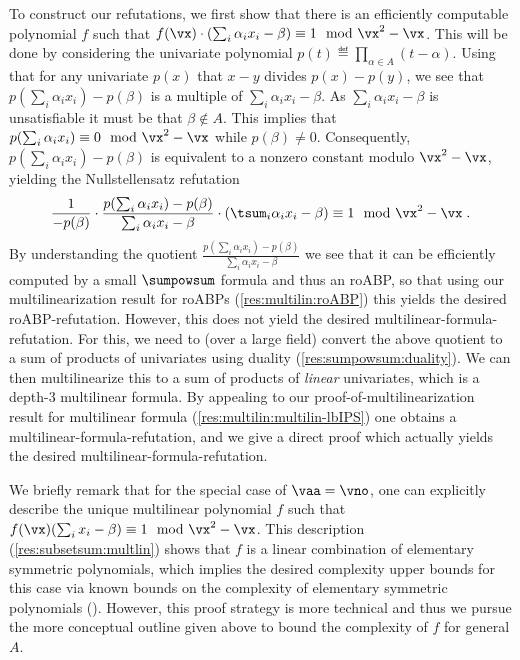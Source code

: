 \documentclass[11pt]{article}
\numberwithin{equation}{section}
\theoremstyle{definition}
\theoremstyle{plain}
\begin{document}
To construct our refutations, we first show that there is an efficiently computable polynomial $f$ such that $f(\vx)\cdot (\sum_i \alpha_ix_i-\beta)\equiv 1\mod\vx^2-\vx$.  This will be done by considering the univariate polynomial $p(t)\eqdef\prod_{\alpha\in A}(t-\alpha)$. Using that for any univariate $p(x)$ that $x-y$ divides $p(x)-p(y)$, we see that $p(\sum_i\alpha_ix_i)-p(\beta)$ is a multiple of $\sum_i \alpha_i x_i-\beta$.  As $\sum_i \alpha_ix_i-\beta$ is unsatisfiable it must be that $\beta\notin A$. This implies that $p(\sum_i\alpha_ix_i)\equiv 0\mod\vx^2-\vx$ while $p(\beta)\ne 0$.  Consequently, $p(\sum_i\alpha_ix_i)-p(\beta)$ is equivalent to a nonzero constant modulo $\vx^2-\vx$, yielding the Nullstellensatz refutation
\[
        \frac{1}{-p(\beta)}\cdot \frac{p(\sum_i\alpha_ix_i)-p(\beta)}{\sum_i \alpha_i x_i-\beta}\cdot (\tsum_i \alpha_i x_i-\beta)\equiv 1 \mod\vx^2-\vx
        \;.
\]
By understanding the quotient $\frac{p(\sum_i\alpha_ix_i)-p(\beta)}{\sum_i \alpha_i x_i-\beta}$ we see that it can be efficiently computed by a small $\sumpowsum$ formula and thus an roABP, so that using our multilinearization result for roABPs (\autoref{res:multilin:roABP}) this yields the desired roABP-\lIPS refutation.  However, this does not yield the desired multilinear-formula-\lIPS refutation.  For this, we need to (over a large field) convert the above quotient to a sum of products of univariates using duality (\autoref{res:sumpowsum:duality}).  We can then multilinearize this to a sum of products of \emph{linear} univariates, which is a depth-3 multilinear formula.  By appealing to our proof-of-multilinearization result for multilinear formula (\autoref{res:multilin:multilin-lbIPS}) one obtains a multilinear-formula-\lbIPS refutation, and we give a direct proof which actually yields the desired multilinear-formula-\lIPS refutation.

We briefly remark that for the special case of $\vaa=\vno$, one can explicitly describe the unique multilinear polynomial $f$ such that $f(\vx)(\sum_i x_i-\beta)\equiv 1\mod\vx^2-\vx$.  This description (\autoref{res:subsetsum:multlin}) shows that $f$ is a linear combination of elementary symmetric polynomials, which implies the desired complexity upper bounds for this case via known bounds on the complexity of elementary symmetric polynomials (\cite{NisanWigderson96}).  However, this proof strategy is more technical and thus we pursue the more conceptual outline given above to bound the complexity of $f$ for general $A$.
\end{document}
